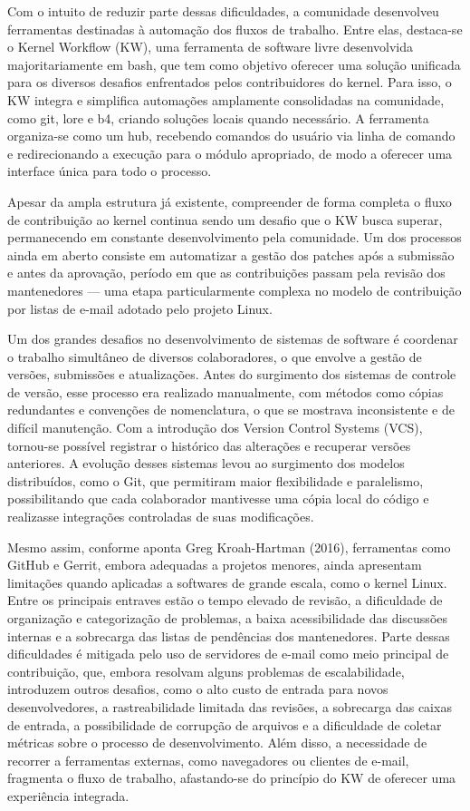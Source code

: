Com o intuito de reduzir parte dessas dificuldades, a comunidade desenvolveu ferramentas destinadas à automação dos fluxos de trabalho. Entre elas, destaca-se o Kernel Workflow (KW), uma ferramenta de software livre desenvolvida majoritariamente em bash, que tem como objetivo oferecer uma solução unificada para os diversos desafios enfrentados pelos contribuidores do kernel. Para isso, o KW integra e simplifica automações amplamente consolidadas na comunidade, como git, lore e b4, criando soluções locais quando necessário. A ferramenta organiza-se como um hub, recebendo comandos do usuário via linha de comando e redirecionando a execução para o módulo apropriado, de modo a oferecer uma interface única para todo o processo.

Apesar da ampla estrutura já existente, compreender de forma completa o fluxo de contribuição ao kernel continua sendo um desafio que o KW busca superar, permanecendo em constante desenvolvimento pela comunidade. Um dos processos ainda em aberto consiste em automatizar a gestão dos patches após a submissão e antes da aprovação, período em que as contribuições passam pela revisão dos mantenedores — uma etapa particularmente complexa no modelo de contribuição por listas de e-mail adotado pelo projeto Linux.

Um dos grandes desafios no desenvolvimento de sistemas de software é coordenar o trabalho simultâneo de diversos colaboradores, o que envolve a gestão de versões, submissões e atualizações. Antes do surgimento dos sistemas de controle de versão, esse processo era realizado manualmente, com métodos como cópias redundantes e convenções de nomenclatura, o que se mostrava inconsistente e de difícil manutenção. Com a introdução dos Version Control Systems (VCS), tornou-se possível registrar o histórico das alterações e recuperar versões anteriores. A evolução desses sistemas levou ao surgimento dos modelos distribuídos, como o Git, que permitiram maior flexibilidade e paralelismo, possibilitando que cada colaborador mantivesse uma cópia local do código e realizasse integrações controladas de suas modificações.

Mesmo assim, conforme aponta Greg Kroah-Hartman (2016), ferramentas como GitHub e Gerrit, embora adequadas a projetos menores, ainda apresentam limitações quando aplicadas a softwares de grande escala, como o kernel Linux. Entre os principais entraves estão o tempo elevado de revisão, a dificuldade de organização e categorização de problemas, a baixa acessibilidade das discussões internas e a sobrecarga das listas de pendências dos mantenedores. Parte dessas dificuldades é mitigada pelo uso de servidores de e-mail como meio principal de contribuição, que, embora resolvam alguns problemas de escalabilidade, introduzem outros desafios, como o alto custo de entrada para novos desenvolvedores, a rastreabilidade limitada das revisões, a sobrecarga das caixas de entrada, a possibilidade de corrupção de arquivos e a dificuldade de coletar métricas sobre o processo de desenvolvimento. Além disso, a necessidade de recorrer a ferramentas externas, como navegadores ou clientes de e-mail, fragmenta o fluxo de trabalho, afastando-se do princípio do KW de oferecer uma experiência integrada.

